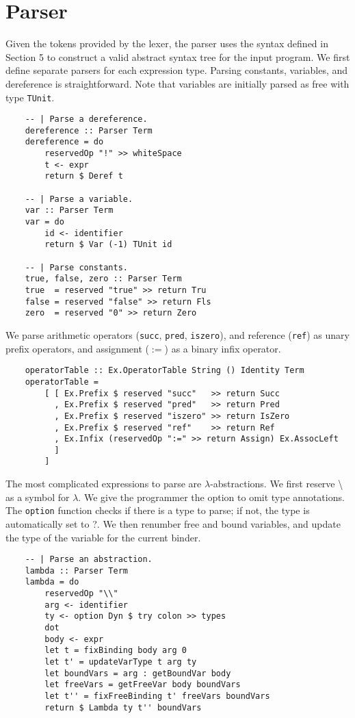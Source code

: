 \section{Parser}
Given the tokens provided by the lexer, the parser uses the syntax defined in Section 5 to construct a valid abstract 
syntax tree for the input program. We first define separate parsers for each expression type. Parsing constants, 
variables, and dereference is straightforward. Note that variables are initially parsed as free with type \lstinline{TUnit}.
\begin{lstlisting}
    -- | Parse a dereference.
    dereference :: Parser Term 
    dereference = do 
        reservedOp "!" >> whiteSpace 
        t <- expr
        return $ Deref t
    
    -- | Parse a variable.
    var :: Parser Term
    var = do
        id <- identifier
        return $ Var (-1) TUnit id 

    -- | Parse constants.
    true, false, zero :: Parser Term
    true  = reserved "true" >> return Tru
    false = reserved "false" >> return Fls
    zero  = reserved "0" >> return Zero
\end{lstlisting}
We parse arithmetic operators (\texttt{succ}, \texttt{pred}, \texttt{iszero}), and reference (\texttt{ref}) as unary 
prefix operators, and assignment ($:=$) as a binary infix operator.
\begin{lstlisting}
    operatorTable :: Ex.OperatorTable String () Identity Term
    operatorTable = 
        [ [ Ex.Prefix $ reserved "succ"   >> return Succ
          , Ex.Prefix $ reserved "pred"   >> return Pred
          , Ex.Prefix $ reserved "iszero" >> return IsZero
          , Ex.Prefix $ reserved "ref"    >> return Ref
          , Ex.Infix (reservedOp ":=" >> return Assign) Ex.AssocLeft
          ]
        ]
\end{lstlisting}
The most complicated expressions to parse are $\lambda$-abstractions. 
We first reserve \textbackslash \:  as a symbol for $\lambda$. We give the programmer the option to omit 
type annotations. The \lstinline{option} function checks if there is a type to parse; if not, 
the type is automatically set to ?. We then renumber free and bound variables, and update the type 
of the variable for the current binder. 
\begin{lstlisting}
    -- | Parse an abstraction.
    lambda :: Parser Term
    lambda = do
        reservedOp "\\" 
        arg <- identifier
        ty <- option Dyn $ try colon >> types  
        dot 
        body <- expr
        let t = fixBinding body arg 0
        let t' = updateVarType t arg ty
        let boundVars = arg : getBoundVar body
        let freeVars = getFreeVar body boundVars
        let t'' = fixFreeBinding t' freeVars boundVars
        return $ Lambda ty t'' boundVars
\end{lstlisting}
